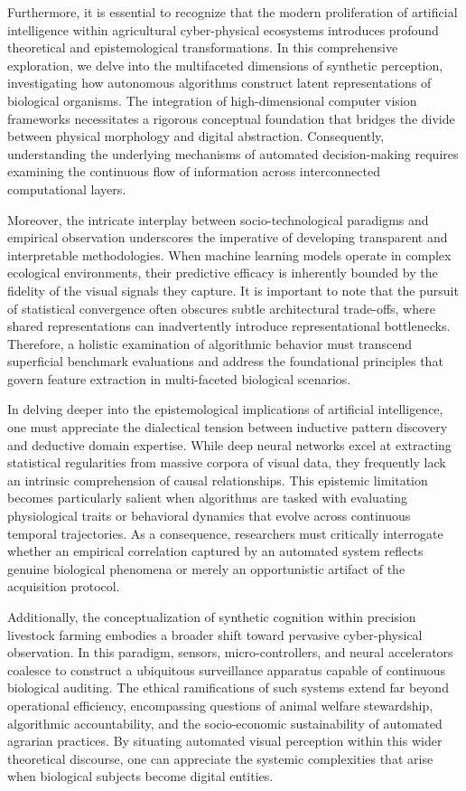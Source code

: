 \documentclass[Times,12pt,oneside,openany,print,index]{report}
\begin{document}
Furthermore, it is essential to recognize that the modern proliferation of artificial intelligence within agricultural cyber-physical ecosystems introduces profound theoretical and epistemological transformations. In this comprehensive exploration, we delve into the multifaceted dimensions of synthetic perception, investigating how autonomous algorithms construct latent representations of biological organisms. The integration of high-dimensional computer vision frameworks necessitates a rigorous conceptual foundation that bridges the divide between physical morphology and digital abstraction. Consequently, understanding the underlying mechanisms of automated decision-making requires examining the continuous flow of information across interconnected computational layers.

Moreover, the intricate interplay between socio-technological paradigms and empirical observation underscores the imperative of developing transparent and interpretable methodologies. When machine learning models operate in complex ecological environments, their predictive efficacy is inherently bounded by the fidelity of the visual signals they capture. It is important to note that the pursuit of statistical convergence often obscures subtle architectural trade-offs, where shared representations can inadvertently introduce representational bottlenecks. Therefore, a holistic examination of algorithmic behavior must transcend superficial benchmark evaluations and address the foundational principles that govern feature extraction in multi-faceted biological scenarios.

In delving deeper into the epistemological implications of artificial intelligence, one must appreciate the dialectical tension between inductive pattern discovery and deductive domain expertise. While deep neural networks excel at extracting statistical regularities from massive corpora of visual data, they frequently lack an intrinsic comprehension of causal relationships. This epistemic limitation becomes particularly salient when algorithms are tasked with evaluating physiological traits or behavioral dynamics that evolve across continuous temporal trajectories. As a consequence, researchers must critically interrogate whether an empirical correlation captured by an automated system reflects genuine biological phenomena or merely an opportunistic artifact of the acquisition protocol.

Additionally, the conceptualization of synthetic cognition within precision livestock farming embodies a broader shift toward pervasive cyber-physical observation. In this paradigm, sensors, micro-controllers, and neural accelerators coalesce to construct a ubiquitous surveillance apparatus capable of continuous biological auditing. The ethical ramifications of such systems extend far beyond operational efficiency, encompassing questions of animal welfare stewardship, algorithmic accountability, and the socio-economic sustainability of automated agrarian practices. By situating automated visual perception within this wider theoretical discourse, one can appreciate the systemic complexities that arise when biological subjects become digital entities.
\end{document}
